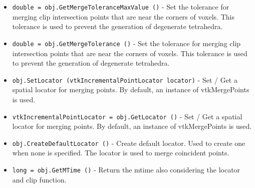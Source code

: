 \begin{itemize}
\item  \verb|double = obj.GetMergeToleranceMaxValue ()| -  Set the tolerance for merging clip intersection points that are near
 the corners of voxels. This tolerance is used to prevent the generation
 of degenerate tetrahedra.

\item  \verb|double = obj.GetMergeTolerance ()| -  Set the tolerance for merging clip intersection points that are near
 the corners of voxels. This tolerance is used to prevent the generation
 of degenerate tetrahedra.

\item  \verb|obj.SetLocator (vtkIncrementalPointLocator locator)| -  Set / Get a spatial locator for merging points. By default, 
 an instance of vtkMergePoints is used.

\item  \verb|vtkIncrementalPointLocator = obj.GetLocator ()| -  Set / Get a spatial locator for merging points. By default, 
 an instance of vtkMergePoints is used.

\item  \verb|obj.CreateDefaultLocator ()| -  Create default locator. Used to create one when none is specified. The 
 locator is used to merge coincident points.

\item  \verb|long = obj.GetMTime ()| -  Return the mtime also considering the locator and clip function.

\end{itemize}
